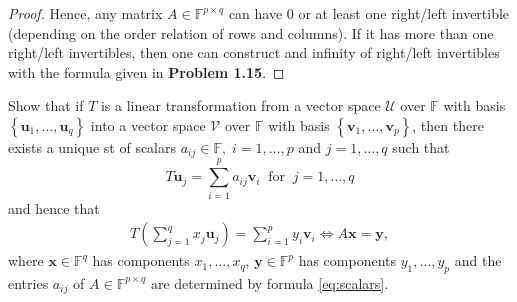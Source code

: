 \documentclass[12pt]{article}
\newenvironment{problem}[2][Problem]{\begin{trivlist} \item[\hskip \labelsep {\bfseries #1}\hskip \labelsep {\bfseries #2.}]}{\end{trivlist}}
\begin{document}
\begin{problem}{1.15}
\begin{proof}
Hence, any matrix $A\in \mathbb{F}^{p\times q}$ can have 0 or at least one right/left invertible (depending on the order relation of rows and columns). If it has more than one right/left invertibles, then one can construct and infinity of right/left invertibles with the formula given in \textbf{Problem 1.15}.

\end{proof}
    \end{problem}
    \begin{problem}{1.19}
      Show that if $T$ is a linear transformation from a vector space $\mathcal{U}$ over $\mathbb{F}$ with basis $\left\{ \mathbf{u}_{1},\dots,\mathbf{u}_{q} \right\}$ into a vector space $\mathcal{V}$ over $\mathbb{F}$ with basis $\left\{ \mathbf{v}_{1},\dots,\mathbf{v}_{p} \right\}$, then there exists a unique st of scalars $a_{ij}\in \mathbb{F},\; i=1,\dots,p$ and $j=1,\dots,q$ such that 
\begin{equation}
  \label{eq:scalars}
  T\mathbf{u}_{j} = \sum_{i=1}^{p}a_{ij}\mathbf{v}_{i} \:\text{ for }\: j=1,\dots,q
\end{equation}
and hence that
\begin{align*}
  T\left( \sum_{j=1}^{q} x_{j}\mathbf{u}_{j} \right) = \sum_{i=1}^{p} y_{i}\mathbf{v}_{i} \iff A\mathbf{x} = \mathbf{y},
\end{align*}
where $\mathbf{x}\in \mathbb{F}^{q}$ has components $x_{1},\dots,x_{q}$, $\mathbf{y}\in \mathbb{F}^{p}$ has components $y_{1},\dots,y_{p}$ and the entries $a_{ij}$ of $A\in \mathbb{F}^{p\times q}$ are determined by formula \ref{eq:scalars}.
\end{problem}
\end{document}
